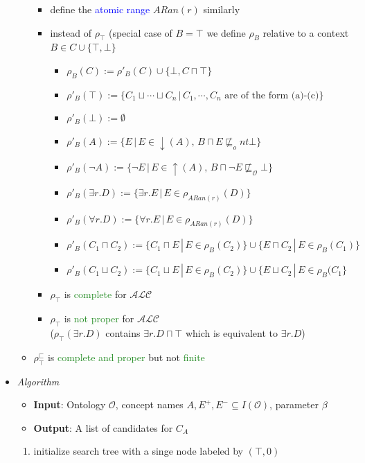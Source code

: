 \documentclass[12pt,a4paper]{article}
\newcommand{\blue}[1]{\textcolor{blue} {#1}}
\newcommand{\green}[1]{\textcolor{ForestGreen} {#1}}
\newcommand{\ont}{\mathcal{O}}
\newcommand{\sse}{\sqsubseteq}
\newcommand{\sand}{\sqcap}
\newcommand{\sor}{\sqcup}
\begin{document}
\begin{itemize}
\begin{itemize}
\begin{itemize}
\item define the \blue{atomic range} $ARan(r)$ similarly
\item instead of $\rho_\top$ (special case of $B=\top$ we define $\rho_B$ relative to a context $B\in C\cup\{\top,\bot\}$
\begin{itemize}
\item $\rho_B(C) := \rho'_B(C) \cup \{\bot,C\sand\top\}$
\item $\rho'_B(\top) := \{C_1 \sor\cdots\sor C_n \,|\, C_1,\cdots,C_n \text{ are of the form (a)-(c)}\}$
\item $\rho'_B(\bot) := \emptyset$
\item $\rho'_B(A) := \{E \,|\, E\in \downarrow (A),\, B\sand E\not\sse_ont \bot\}$
\item $\rho'_B(\neg A) := \{\neg E \,|\, E\in \uparrow (A), \, B\sand \neg E \not\sse_\ont \bot\}$
\item $\rho'_B(\exists r.D) := \{\exists r.E \,|\, E\in \rho_{ARan(r)}(D)\}$
\item $\rho'_B(\forall r.D) := \{\forall r.E \,|\, E\in \rho_{ARan(r)}(D)\}$
\item $\rho'_B(C_1 \sand C_2) := \{C_1\sand E \,|\, E\in \rho_B(C_2)\} \cup \{E\sand C_2 \,|\, E\in \rho_B(C_1)\}$
\item $\rho'_B(C_1 \sor C_2) := \{C_1 \sor E \,|\, E\in \rho_B(C_2)\} \cup \{E\sor C_2 \,|\, E\in \rho_B(C_1\}$
\end{itemize}
\item $\rho_\top$ is \green{complete} for $\mathcal{ALC}$
\item $\rho_\top$ is \green{not proper} for $\mathcal{ALC}$\\($\rho_\top(\exists r.D)$ contains $\exists r.D \sand \top$ which is equivalent to $\exists r.D$)
\end{itemize}
\item $\rho_\top^\sqsubset$ is \green{complete and proper} but not \green{finite}
\end{itemize}
\item \textit{Algorithm}
\begin{itemize}
\item \textbf{Input}: Ontology $\ont$, concept names $A, E^+, E^- \subseteq I(\ont)$, parameter $\beta$
\item \textbf{Output}: A list of candidates for $C_A$
\end{itemize}
\begin{enumerate}
\item initialize search tree with a singe node labeled by $(\top, 0)$

\end{enumerate}
\end{itemize}
\end{document}
